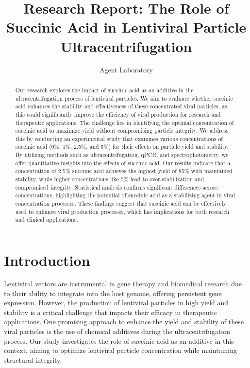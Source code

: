 \documentclass{article}
\title{Research Report: The Role of Succinic Acid in Lentiviral Particle Ultracentrifugation}
\author{Agent Laboratory}
\begin{document}
\maketitle

\begin{abstract}
Our research explores the impact of succinic acid as an additive in the ultracentrifugation process of lentiviral particles. We aim to evaluate whether succinic acid enhances the stability and effectiveness of these concentrated viral particles, as this could significantly improve the efficiency of viral production for research and therapeutic applications. The challenge lies in identifying the optimal concentration of succinic acid to maximize yield without compromising particle integrity. We address this by conducting an experimental study that examines various concentrations of succinic acid (0\%, 1\%, 2.5\%, and 5\%) for their effects on particle yield and stability. By utilizing methods such as ultracentrifugation, qPCR, and spectrophotometry, we offer quantitative insights into the effects of succinic acid. Our results indicate that a concentration of 2.5\% succinic acid achieves the highest yield of 85\% with maintained stability, while higher concentrations like 5\% lead to over-stabilization and compromised integrity. Statistical analysis confirms significant differences across concentrations, highlighting the potential of succinic acid as a stabilizing agent in viral concentration processes. These findings suggest that succinic acid can be effectively used to enhance viral production processes, which has implications for both research and clinical applications.
\end{abstract}

\section{Introduction}
Lentiviral vectors are instrumental in gene therapy and biomedical research due to their ability to integrate into the host genome, offering persistent gene expression. However, the production of lentiviral particles in high yield and stability is a critical challenge that impacts their efficacy in therapeutic applications. One promising approach to enhance the yield and stability of these viral particles is the use of chemical additives during the ultracentrifugation process. Our study investigates the role of succinic acid as an additive in this context, aiming to optimize lentiviral particle concentration while maintaining structural integrity.
\end{document}

